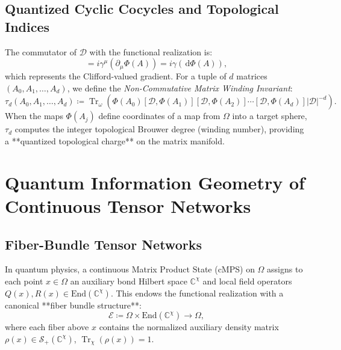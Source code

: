 \documentclass[11pt,a4paper,reqno]{amsart}
\theoremstyle{definition}
\numberwithin{equation}{section}
\newcommand{\Tr}{\operatorname{Tr}}
\newcommand{\dif}{\,\mathrm{d}}
\begin{document}
\subsection{Quantized Cyclic Cocycles and Topological Indices}
The commutator of $\mathcal{D}$ with the functional realization is:
\begin{equation}
    [\mathcal{D}, \Phi(A)] = i \gamma^\mu (\partial_\mu \Phi(A)) = i \gamma(\dif \Phi(A)),
\end{equation}
which represents the Clifford-valued gradient. For a tuple of $d$ matrices $(A_0, A_1, \dots, A_d)$, we define the \emph{Non-Commutative Matrix Winding Invariant}:
\begin{equation}
    \tau_d(A_0, A_1, \dots, A_d) \coloneqq \Tr_\omega \left( \Phi(A_0) [\mathcal{D}, \Phi(A_1)] [\mathcal{D}, \Phi(A_2)] \cdots [\mathcal{D}, \Phi(A_d)] |\mathcal{D}|^{-d} \right).
\end{equation}
When the maps $\Phi(A_j)$ define coordinates of a map from $\Omega$ into a target sphere, $\tau_d$ computes the integer topological Brouwer degree (winding number), providing a **quantized topological charge** on the matrix manifold.

\section{Quantum Information Geometry of Continuous Tensor Networks}
\label{sec:quantum_info}

\subsection{Fiber-Bundle Tensor Networks}
In quantum physics, a continuous Matrix Product State (cMPS) \cite{verstraete2010continuous} on $\Omega$ assigns to each point $x \in \Omega$ an auxiliary bond Hilbert space $\mathbb{C}^\chi$ and local field operators $Q(x), R(x) \in \mathrm{End}(\mathbb{C}^\chi)$. 
This endows the functional realization with a canonical **fiber bundle structure**:
\begin{equation}
    \mathcal{E} \coloneqq \Omega \times \mathrm{End}(\mathbb{C}^\chi) \longrightarrow \Omega,
\end{equation}
where each fiber above $x$ contains the normalized auxiliary density matrix $\rho(x) \in \mathcal{S}_+(\mathbb{C}^\chi)$, $\Tr_\chi(\rho(x)) = 1$.
\end{document}
